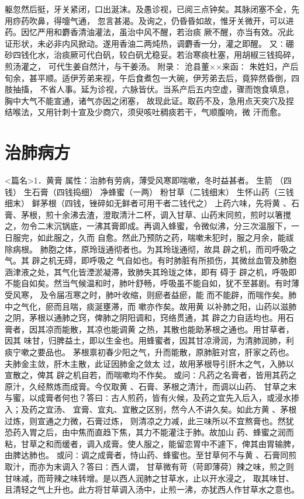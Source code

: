 \documentclass[a4paper,12pt,UTF8,twoside]{ctexbook}
\begin{document}
躯忽然后挺，牙关紧闭，口出涎沫。及愚诊视，已阅三点钟矣。其脉闭塞不全，先用痧药吹鼻，得嚏气通， 
忽言甚渴。及询之，仍昏昏如故，惟牙关微开，可以进药。因忆严用和麝香清油灌法，虽治中风不醒，若治痰 
厥不醒，亦当有效。况此证形状，未必非内风掀动。遂用香油二两炖热，调麝香一分，灌之即醒。 
又∶硼砂四钱化水，治痰厥可代白矾，较白矾尤稳妥。若治寒痰杜塞，用胡椒三钱捣碎，煎汤灌之， 
可代生姜自然汁，与干姜汤。 
附录∶ 
沧县董××来函∶ 
朱姓妇，产后旬余，甚平顺。适伊芳弟来视，午后食煮包一大碗，伊芳弟去后，竟猝然昏倒，四肢抽搐， 
不省人事。延为诊视，六脉皆伏。当系产后五内空虚，骤而饱食填息，胸中大气不能宣通，诸气亦因之闭塞， 
故现此证。取药不及，急用点天突穴及捏结喉法，又用针刺十宣及少商穴，须臾咳吐稠痰若干，气顺腹响，微 
汗而愈。 

\chapter{治肺病方}
<篇名>1．黄膏
属性：治肺有劳病，薄受风寒即喘嗽，冬时益甚者。 
生箭 （四钱） 生石膏（四钱捣细） 净蜂蜜（一两） 粉甘草（二钱细末） 
生怀山药（三钱细末） 鲜茅根（四钱，锉碎如无鲜者可用干者二钱代之） 
上药六味，先将黄 、石膏、茅根，煎十余沸去渣，澄取清汁二杯，调入甘草、山药末同煎，煎时以箸搅 
之，勿令二末沉锅底，一沸其膏即成。再调入蜂蜜，令微似沸，分三次温服下，一日服完，如此服之，久而 
自愈。然此乃预防之药，喘嗽未犯时，服之月余，能祓除病根。 
肺胞之体，原玲珑通彻者也。为其玲珑通彻，故具 辟之机，而司呼吸之气。其 辟之机无碍，即呼吸之 
气自如也。有时肺脏有所损伤，其微丝血管及肺胞涵津液之处，其气化皆湮淤凝滞，致肺失其玲珑之体，即有 
碍于 辟之机，呼吸即不能自如矣。然当气候温和时，肺叶舒畅，呼吸虽不能自如，犹不至甚剧。有时薄受风寒， 
及令届冱寒之时，肺叶收缩，则瘀者益瘀，能 而不能辟，而喘作矣。肺中之气化，瘀而且喘，痰涎壅滞，而 
嗽亦作矣。故用黄 以补肺之阳，山药以滋肺之阴，茅根以通肺之窍，俾肺之阴阳调和，窍络贯通，其 
辟之力自适均也。用石膏者，因其凉而能散，其凉也能调黄 之热，其散也能助茅根之通也。用甘草者，因其 
味甘，归脾益土，即以生金也。用蜂蜜者，因其甘凉滑润，为清肺润肺，利痰宁嗽之要品也。 
茅根禀初春少阳之气，升而能散，原肺脏对宫，肝家之药也。夫肺金主敛，肝木主散，此证因肺金之敛太 
过，故用茅根导引肝木之气，入肺以宣散之，俾其 辟之机自若，而喘嗽均不作矣。 
或问∶凡药之名膏者，皆用其药之原汁，久经熬炼而成膏。今仅取黄 、石膏、茅根之清汁，而调以山药、 
甘草之末与蜜，以成膏者何也？答曰∶古人煎药，皆有火候，及药之宜先入后入，或浸水掺入；及药之宜汤、 
宜膏、宜丸、宜散之区别，然今人不讲久矣。如此方黄 、茅根过炼，则宣通之力微，石膏过炼， 
则清凉之力减，此三味所以不宜熬膏也。然犹恐药入胃之后，由中焦而直趋下焦，其力不能灌注于肺。故加山 
药、蜂蜜之润而粘，甘草之和而缓者，调入成膏。使人服之，能留恋胃中不遽下，俾其由胃输脾，由脾达肺也。 
或问∶调之成膏者，恃山药、蜂蜜也。至甘草何不与黄 、石膏同煎取汁，而亦为末调入？答曰∶西人谓， 
甘草微有苛（苛即薄荷）辣之味，煎之则甘味减，而苛辣之味转增。是以西人润肺之甘草水，止以开水浸之， 
取其味甘、且清轻之气上升也。此方将甘草调入汤中，止煎一沸，亦犹西人作甘草水之意也。 
\end{document}
